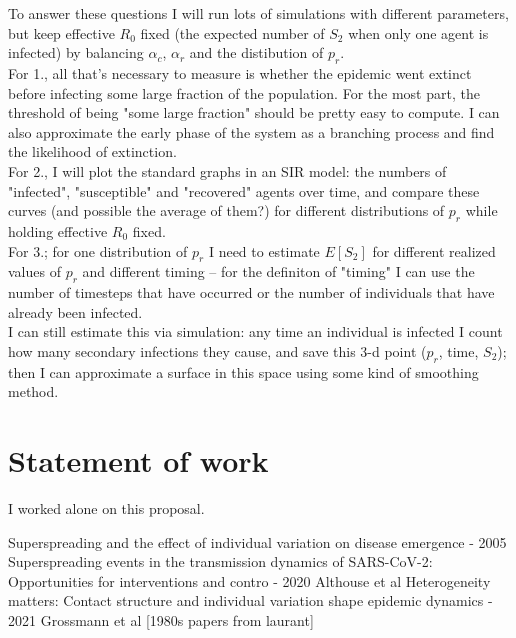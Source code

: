 \documentclass{article}
\begin{document}
To answer these questions I will run lots of simulations with different
parameters, but keep effective $R_0$ fixed (the expected number of
$S_2$ when only one agent is infected) by balancing $\alpha_c$, $\alpha_r$ and
the distibution of $p_r$.\\

For 1., all that's necessary to measure is whether the epidemic went extinct
before infecting some large fraction of the population.  For the most part, the
threshold of being "some large fraction" should be pretty easy to compute. I
can also approximate the early phase of the system as a branching process and
find the likelihood of extinction.\\

For 2., I will plot the standard graphs in an SIR model: the numbers of
"infected", "susceptible" and "recovered" agents over time, and compare these
curves (and possible the average of them?) for different distributions of $p_r$
while holding effective $R_0$ fixed.\\

For 3.; for one distribution of $p_r$ I need to estimate $E[S_2]$ for different
realized values of $p_r$ and different timing – for the definiton of "timing" I can
use the number of timesteps that have occurred or the number of individuals
that have already been infected.\\
I can still estimate this via simulation: any time an individual is infected
I count how many secondary infections they cause, and save this 3-d point
($p_r$, time, $S_2$); then I can approximate a surface in this space using
some kind of smoothing method.



\section{Statement of work}
I worked alone on this proposal.

\begin{thebibliography}{9}
Superspreading and the effect of individual variation on disease emergence - 2005
Superspreading events in the transmission
dynamics of SARS-CoV-2: Opportunities for
interventions and contro
- 2020 Althouse et al
Heterogeneity matters: Contact structure and
individual variation shape epidemic dynamics
- 2021 Grossmann et al
[1980s papers from laurant]
\end{thebibliography}
\end{document}
